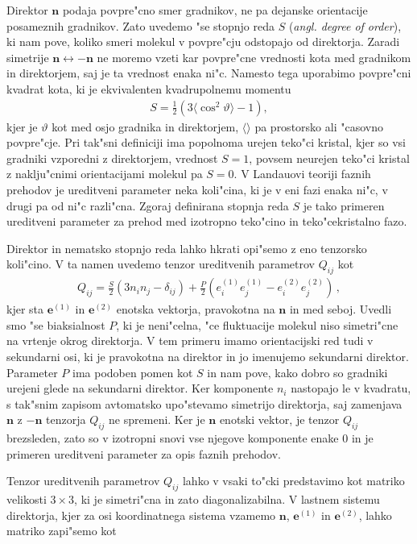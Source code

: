 \documentclass[a4paper,10pt]{article}
\renewcommand{\vec}{\mathbf}
\newcommand{\angl}[1]{(\textit{angl. #1})}
\begin{document}
Direktor $\mathbf{n}$ podaja povpre"cno smer gradnikov, ne pa dejanske orientacije posameznih gradnikov. 
Zato uvedemo "se stopnjo reda $S$ \angl{degree of order}, ki nam pove, koliko smeri molekul v povpre"cju odstopajo od direktorja. 
Zaradi simetrije $\mathbf{n} \leftrightarrow -\mathbf{n}$ ne moremo vzeti kar povpre"cne vrednosti kota med gradnikom in direktorjem, saj je ta vrednost enaka ni"c. 
Namesto tega uporabimo povpre"cni kvadrat kota, ki je ekvivalenten kvadrupolnemu momentu\cite{kleman}
\begin{align}
 S = \frac{1}{2}\left(3\langle\cos^2\vartheta\rangle-1\right),
\end{align}
kjer je $\vartheta$ kot med osjo gradnika in direktorjem, $\langle\rangle$ pa prostorsko ali "casovno povpre"cje. 
Pri tak"sni definiciji ima popolnoma urejen teko"ci kristal, kjer so vsi gradniki vzporedni z direktorjem, vrednost $S=1$, povsem neurejen teko"ci kristal z naklju"cnimi orientacijami molekul pa $S=0$. 
V Landauovi teoriji faznih prehodov je ureditveni parameter neka koli"cina, ki je v eni fazi enaka ni"c, v drugi pa od ni"c razli"cna. 
Zgoraj definirana stopnja reda $S$ je tako primeren ureditveni parameter za prehod med izotropno teko"cino in teko"cekristalno fazo\cite{degennes}. 

Direktor in nematsko stopnjo reda lahko hkrati opi"semo z eno tenzorsko koli"cino. V ta namen uvedemo tenzor ureditvenih parametrov $Q_{ij}$ kot
\begin{align}
  Q_{ij} = \frac{S}{2}(3n_i n_j - \delta_{ij}) + \frac{P}{2}(e^{(1)}_i e^{(1)}_j - e^{(2)}_i e^{(2)}_j)\,,
\end{align}
kjer sta $\mathbf{e}^{(1)}$ in $\mathbf{e}^{(2)}$ enotska vektorja, pravokotna na $\mathbf{n}$ in med seboj. Uvedli smo "se biaksialnost $P$, ki je neni"celna, "ce fluktuacije molekul niso simetri"cne na vrtenje okrog direktorja. V tem primeru imamo orientacijski red tudi v sekundarni osi, ki je pravokotna na direktor in jo imenujemo sekundarni direktor. Parameter $P$ ima podoben pomen kot $S$ in nam pove, kako dobro so gradniki urejeni glede na sekundarni direktor. Ker komponente $n_i$ nastopajo le v kvadratu, s tak"snim zapisom avtomatsko upo"stevamo simetrijo direktorja, saj zamenjava $\mathbf{n}$ z $-\mathbf{n}$ tenzorja $Q_{ij}$ ne spremeni. Ker je $\mathbf{n}$ enotski vektor, je tenzor $Q_{ij}$ brezsleden, zato so v izotropni snovi vse njegove komponente enake 0 in je primeren ureditveni parameter za opis faznih prehodov. 

Tenzor ureditvenih parametrov $Q_{ij}$ lahko v vsaki to"cki predstavimo kot matriko velikosti $3\times 3$, ki je simetri"cna in zato diagonalizabilna. 
V lastnem sistemu direktorja, kjer za osi koordinatnega sistema vzamemo $\vec n$, $\vec e^{(1)}$ in $\vec e^{(2)}$, lahko matriko zapi"semo kot
\end{document}
